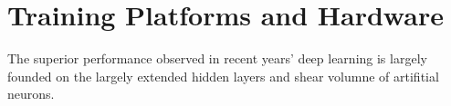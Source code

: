 \section{Training Platforms and Hardware}
The superior performance observed in recent years' deep learning is largely founded on the largely extended hidden layers and shear volumne  of artifitial neurons. 